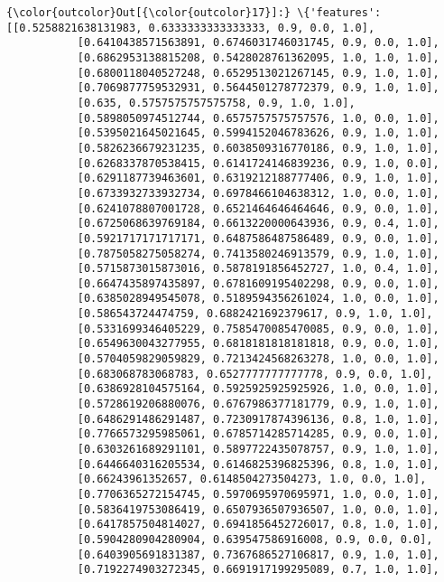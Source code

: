 \documentclass[11pt]{article}
\begin{document}
\begin{Verbatim}[commandchars=\\\{\}]
{\color{outcolor}Out[{\color{outcolor}17}]:} \{'features': [[0.5258821638131983, 0.6333333333333333, 0.9, 0.0, 1.0],
           [0.6410438571563891, 0.6746031746031745, 0.9, 0.0, 1.0],
           [0.6862953138815208, 0.5428028761362095, 1.0, 1.0, 1.0],
           [0.6800118040527248, 0.6529513021267145, 0.9, 1.0, 1.0],
           [0.7069877759532931, 0.5644501278772379, 0.9, 1.0, 1.0],
           [0.635, 0.5757575757575758, 0.9, 1.0, 1.0],
           [0.5898050974512744, 0.6575757575757576, 1.0, 0.0, 1.0],
           [0.5395021645021645, 0.5994152046783626, 0.9, 1.0, 1.0],
           [0.5826236679231235, 0.6038509316770186, 0.9, 1.0, 1.0],
           [0.6268337870538415, 0.6141724146839236, 0.9, 1.0, 0.0],
           [0.6291187739463601, 0.6319212188777406, 0.9, 1.0, 1.0],
           [0.6733932733932734, 0.6978466104638312, 1.0, 0.0, 1.0],
           [0.6241078807001728, 0.6521464646464646, 0.9, 0.0, 1.0],
           [0.6725068639769184, 0.6613220000643936, 0.9, 0.4, 1.0],
           [0.5921717171717171, 0.6487586487586489, 0.9, 0.0, 1.0],
           [0.7875058275058274, 0.7413580246913579, 0.9, 1.0, 1.0],
           [0.5715873015873016, 0.5878191856452727, 1.0, 0.4, 1.0],
           [0.6647435897435897, 0.6781609195402298, 0.9, 0.0, 1.0],
           [0.6385028949545078, 0.5189594356261024, 1.0, 0.0, 1.0],
           [0.586543724474759, 0.6882421692379617, 0.9, 1.0, 1.0],
           [0.5331699346405229, 0.7585470085470085, 0.9, 0.0, 1.0],
           [0.6549630043277955, 0.6818181818181818, 0.9, 0.0, 1.0],
           [0.5704059829059829, 0.7213424568263278, 1.0, 0.0, 1.0],
           [0.683068783068783, 0.6527777777777778, 0.9, 0.0, 1.0],
           [0.6386928104575164, 0.5925925925925926, 1.0, 0.0, 1.0],
           [0.5728619206880076, 0.6767986377181779, 0.9, 1.0, 1.0],
           [0.6486291486291487, 0.7230917874396136, 0.8, 1.0, 1.0],
           [0.7766573295985061, 0.6785714285714285, 0.9, 0.0, 1.0],
           [0.6303261689291101, 0.5897722435078757, 0.9, 1.0, 1.0],
           [0.6446640316205534, 0.6146825396825396, 0.8, 1.0, 1.0],
           [0.66243961352657, 0.6148504273504273, 1.0, 0.0, 1.0],
           [0.7706365272154745, 0.5970695970695971, 1.0, 0.0, 1.0],
           [0.5836419753086419, 0.6507936507936507, 1.0, 0.0, 1.0],
           [0.6417857504814027, 0.6941856452726017, 0.8, 1.0, 1.0],
           [0.5904280904280904, 0.639547586916008, 0.9, 0.0, 0.0],
           [0.6403905691831387, 0.7367686527106817, 0.9, 1.0, 1.0],
           [0.7192274903272345, 0.6691917199295089, 0.7, 1.0, 1.0],

\end{Verbatim}
\end{document}
